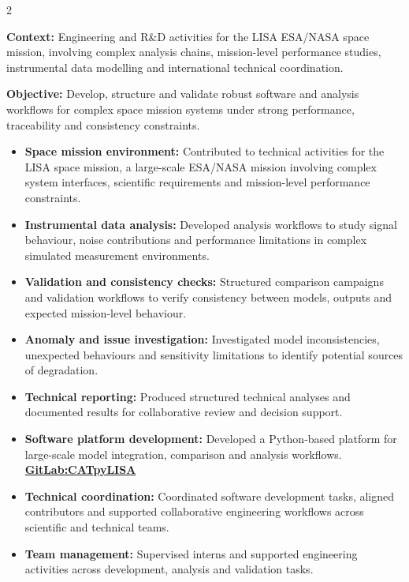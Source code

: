 \documentclass[8pt,a4paper,ragged2e,withhyper]{../_shared/altacv}
\begin{document}
\begin{paracol}{2}
\divider


\textbf{Context:} Engineering and R\&D activities for the LISA ESA/NASA space mission, involving complex analysis chains, mission-level performance studies, instrumental data modelling and international technical coordination.

\textbf{Objective:} Develop, structure and validate robust software and analysis workflows for complex space mission systems under strong performance, traceability and consistency constraints.

\begin{itemize}
\item \textbf{Space mission environment:} Contributed to technical activities for the LISA space mission, a large-scale ESA/NASA mission involving complex system interfaces, scientific requirements and mission-level performance constraints.
\item \textbf{Instrumental data analysis:} Developed analysis workflows to study signal behaviour, noise contributions and performance limitations in complex simulated measurement environments.
\item \textbf{Validation and consistency checks:} Structured comparison campaigns and validation workflows to verify consistency between models, outputs and expected mission-level behaviour.
\item \textbf{Anomaly and issue investigation:} Investigated model inconsistencies, unexpected behaviours and sensitivity limitations to identify potential sources of degradation.
\item \textbf{Technical reporting:} Produced structured technical analyses and documented results for collaborative review and decision support.
\item \textbf{Software platform development:} Developed a Python-based platform for large-scale model integration, comparison and analysis workflows. \textcolor{DarkPastelRed}{\href{https://gitlab.oca.eu/gboileau/lisa_l3_tools}{\bf GitLab:CATpyLISA}}
\item \textbf{Technical coordination:} Coordinated software development tasks, aligned contributors and supported collaborative engineering workflows across scientific and technical teams.
\item \textbf{Team management:} Supervised interns and supported engineering activities across development, analysis and validation tasks.
\end{itemize}


\end{paracol}
\end{document}
